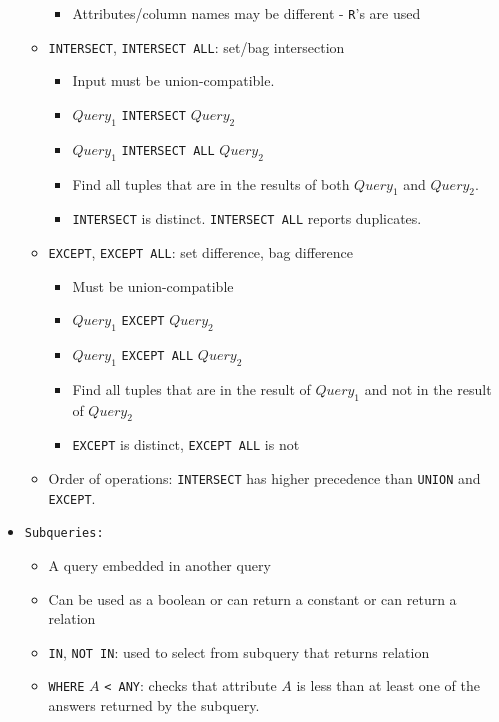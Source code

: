 \documentclass[landscape,8pt]{extarticle}
\newcommand{\code}{\lstinline}
\begin{document}
\begin{multicols}{4}
\begin{itemize}
\begin{itemize}
\begin{itemize}
            \item Attributes/column names may be different - \code{R}'s are used
        \end{itemize}
        \item \code{INTERSECT}, \code{INTERSECT ALL}: set/bag intersection
        \begin{itemize}
            \item Input must be union-compatible.
            \item $Query_1$ \code{INTERSECT} $Query_2$ 
            \item $Query_1$ \code{INTERSECT ALL} $Query_2$
            \item Find all tuples that are in the results of both $Query_1$ and $Query_2$.
            \item \code{INTERSECT} is distinct. \code{INTERSECT ALL} reports duplicates.
        \end{itemize}
        \item \code{EXCEPT}, \code{EXCEPT ALL}: set difference, bag difference
        \begin{itemize}
            \item Must be union-compatible
            \item $Query_1$ \code{EXCEPT} $Query_2$
            \item $Query_1$ \code{EXCEPT ALL} $Query_2$
            \item Find all tuples that are in the result of $Query_1$ and not in the result of $Query_2$
            \item \code{EXCEPT} is distinct, \code{EXCEPT ALL} is not
        \end{itemize}
        \item Order of operations: \code{INTERSECT} has higher precedence than \code{UNION} and \code{EXCEPT}.
    \end{itemize}
    \item \code{Subqueries:}
    \begin{itemize}
        \item A query embedded in another query
        \item Can be used as a boolean or can return a constant or can return a relation
        \item \code{IN}, \code{NOT IN}: used to select from subquery that returns relation
        \item \code{WHERE} $A$ \code{< ANY}: checks that attribute $A$ is less than at least one of
        the answers returned by the subquery.

\end{itemize}
\end{itemize}
\end{multicols}
\end{document}
